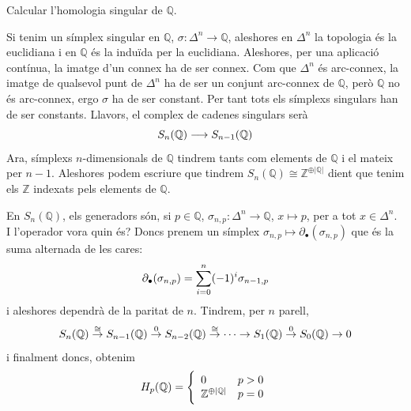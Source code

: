\documentclass[../main.tex]{subfiles}
\begin{document}
\begin{exercici}
Calcular l'homologia singular de $\mathbb{Q}$. 
\end{exercici}
\begin{sol}
Si tenim un símplex singular en $\mathbb{Q}$, $\sigma:\Delta^n\rightarrow \mathbb{Q}$, aleshores en $\Delta^n$ la topologia és la euclidiana i en $\mathbb{Q}$ és la induïda per la euclidiana. Aleshores, per una aplicació contínua, la imatge d'un connex ha de ser connex. Com que $\Delta^n$ és arc-connex, la imatge de qualsevol punt de $\Delta^n$ ha de ser un conjunt arc-connex de $\mathbb{Q}$, però $\mathbb{Q}$ no és arc-connex, ergo $\sigma$ ha de ser constant. Per tant tots els símplexs singulars han de ser constants. Llavors, el complex de cadenes singulars serà
\begin{equation}
    \notag
    S_n(\mathbb{Q})\longrightarrow S_{n-1}(\mathbb{Q})
\end{equation}
Ara, símplexs $n$-dimensionals de $\mathbb{Q}$ tindrem tants com elements de $\mathbb{Q}$ i el mateix per $n-1$. Aleshores podem escriure que tindrem $S_n(\mathbb{Q})\cong\mathbb{Z}^{\oplus|\mathbb{Q}|}$ dient que tenim els $\mathbb{Z}$ indexats pels elements de $\mathbb{Q}$.

En $S_n(\mathbb{Q})$, els generadors són, si $p\in\mathbb{Q}$, $\sigma_{n,p}:\Delta^n\rightarrow \mathbb{Q}$, $x\mapsto p$, per a tot $x\in \Delta^n$. I l'operador vora quin és? Doncs prenem un símplex $\sigma_{n,p}\mapsto\partial_\bullet(\sigma_{n,p})$ que és la suma alternada de les cares:
\begin{equation}
    \notag
    \partial_\bullet(\sigma_{n,p}) = \sum_{i=0}^n(-1)^{i}\sigma_{n-1,p}
\end{equation}
i aleshores dependrà de la paritat de $n$. Tindrem, per $n$ parell,
\begin{equation}
    \notag
    S_n(\mathbb{Q})\overset{\cong}{\rightarrow}S_{n-1}(\mathbb{Q})\overset{0}{\rightarrow}S_{n-2}(\mathbb{Q})\overset{\cong}{\rightarrow}\cdots\rightarrow S_1(\mathbb{Q})\overset{0}{\rightarrow}S_0(\mathbb{Q})\rightarrow 0
\end{equation}
i finalment doncs, obtenim
\begin{equation}
    \notag
    H_p(\mathbb{Q}) = \left\{
    \begin{array}{ll}
        0 & p>0 \\
        \mathbb{Z}^{\oplus|\mathbb{Q}|} & p=0
    \end{array}
    \right.
\end{equation}
\end{sol}
\end{document}
